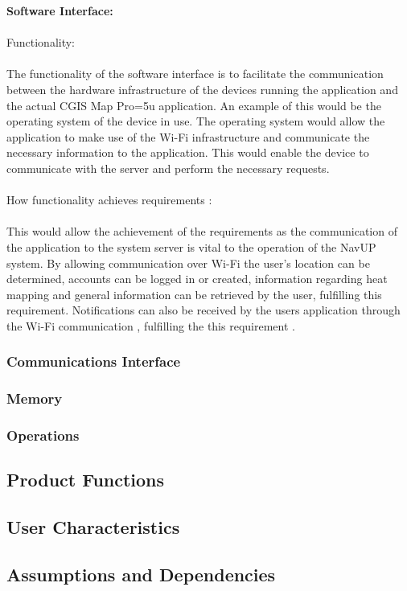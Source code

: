 \documentclass{article}
\begin{document}
{\textbf{Software Interface:}\\\\
Functionality:\\\\
The functionality of the software interface is to facilitate the communication between the hardware infrastructure of the devices running the application and the actual CGIS Map Pro=5u  application. An example of this would be the operating system of the device in use. The operating system would allow the application to make use of the Wi-Fi infrastructure and communicate the necessary information to the application. This would enable the device to communicate with the server and perform the necessary requests.\\\\
How functionality achieves requirements :\\\\
This would allow the achievement of the requirements as the communication of the application to the system server is vital to the operation of the NavUP system. By allowing communication over Wi-Fi the user's location can be determined, accounts can be logged in or created, information regarding heat mapping and general information can be retrieved by the user, fulfilling this requirement. Notifications can also be received by the users application through the Wi-Fi communication , fulfilling the this requirement .}

            \subsubsection{Communications Interface}
            \subsubsection{Memory}
            \subsubsection{Operations}
           
        
		\subsection{Product Functions}
    	\subsection{User Characteristics}
    	\subsection{Assumptions and Dependencies}
        
\end{document}
